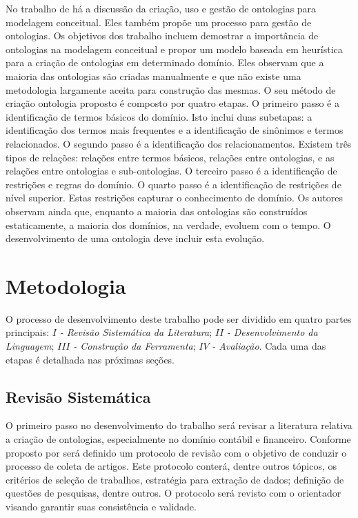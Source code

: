 \documentclass[msc,proposal,hidelot,hideabstract]{ppgccufmg} %
\begin{document}
No trabalho de \cite{sugumaran2002ontologies} há a discussão da criação, uso e gestão de ontologias para modelagem conceitual. Eles também propõe um processo para gestão de ontologias. Os objetivos dos trabalho incluem demostrar a importância de ontologias na modelagem conceitual e propor um modelo baseada em heurística  para a criação de ontologias em determinado domínio. Eles observam que a maioria das ontologias são criadas manualmente e que não existe uma metodologia largamente aceita para construção das mesmas. O seu método de criação ontologia proposto é composto por quatro etapas. O primeiro passo é a identificação de termos básicos do domínio. Isto inclui duas subetapas: a identificação dos termos mais frequentes e a identificação de sinônimos e termos relacionados. O segundo passo é a identificação dos relacionamentos. Existem três tipos de relações: relações entre termos básicos, relações entre ontologias, e as relações entre ontologias e sub-ontologias. O terceiro passo é a identificação de restrições e regras do domínio. O quarto passo é a identificação de restrições de nível superior. Estas restrições capturar o conhecimento de domínio. Os autores observam ainda que, enquanto a maioria das ontologias são construídos estaticamente, a maioria dos domínios, na verdade, evoluem com o tempo. O desenvolvimento de uma ontologia deve incluir esta evolução.

\chapter{Metodologia}
\label{ch:metodologia}

O processo de desenvolvimento deste trabalho pode ser dividido em quatro partes principais: $I$\textit{ - Revisão Sistemática da Literatura}; $II$\textit{ - Desenvolvimento da Linguagem}; $III$\textit{ - Construção da Ferramenta}; $IV$\textit{ - Avaliação}. Cada uma das etapas é detalhada nas próximas seções.

\section{Revisão Sistemática}
\label{sec:revisao_sistematica}

O primeiro passo no desenvolvimento do trabalho será revisar a literatura relativa a criação de ontologias, especialmente no domínio contábil e financeiro. Conforme proposto por \cite{wohlin2012experimentation} será definido um protocolo de revisão com o objetivo de conduzir o processo de coleta de artigos. Este protocolo conterá, dentre outros tópicos, os critérios de seleção de trabalhos, estratégia para extração de dados; definição de questões de pesquisas, dentre outros. O protocolo será revisto com o orientador visando garantir suas consistência e validade.
\end{document}
